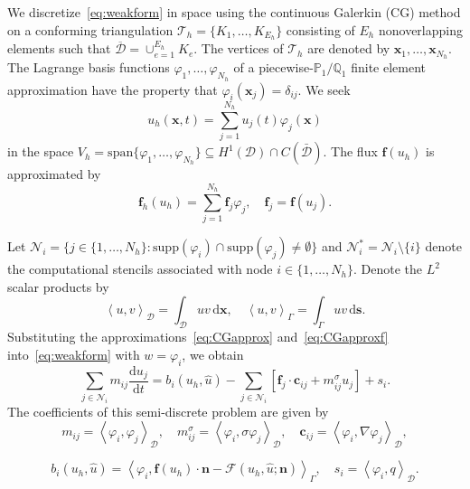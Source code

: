 \documentclass[preprint, 11pt]{elsarticle}
\newcommand{\diff}{\mathrm{d} }
\newcommand{\N}{\mathcal{N}}
\newcommand{\x}{\mathbf{x}}
\newcommand{\s}{\mathbf{s}}
\newcommand{\n}{\mathbf{n}}
\newcommand{\f}{\mathbf{f}}
\newcommand{\con}{\mathbf{c}}
\newcommand{\D}{\mathcal{D}}
\newcommand{\sprod}[2]{\left\langle #1, #2 \right\rangle}
\begin{document}
We discretize~\eqref{eq:weakform} in space using the continuous Galerkin (CG) method on a conforming triangulation $\mathcal{T}_h =\{K_1,\ldots,K_{E_h}\}$ consisting of $E_h$ nonoverlapping elements such that $\overline{\D} = \cup_{e=1}^{E_h} K_e$. The vertices of  $\mathcal{T}_h$ are denoted by $\x_1,\ldots,\x_{N_h}$.
The Lagrange basis functions $\varphi_1,\ldots, \varphi_{N_h}$ of
 a piecewise-$\mathbb{P}_1/\mathbb{Q}_1$ finite element approximation have the property that $\varphi_i(\x_j) = \delta_{ij}$. We seek 
\begin{equation}\label{eq:CGapprox}
    u_h(\x,t) = \sum_{j = 1}^{N_h} u_j(t) \varphi_j(\x)
\end{equation}
in the space $V_h=\mbox{span}\{\varphi_1,\ldots, \varphi_{N_h}\}\subseteq H^1(\mathcal D)\cap C(\bar{\mathcal D})$. The flux $\f(u_h)$ is approximated by
\begin{equation}\label{eq:CGapproxf}
    \f_h(u_h) = \sum_{j = 1}^{N_h}\f_j \varphi_j,\quad \f_j = \f(u_j).
\end{equation}

Let $\N_i =\{j\in \{1,\ldots, N_h\}: \mathrm{supp}(\varphi_i) \cap\mathrm{supp}(\varphi_j)\not= \emptyset\}$ and $\N_i^* = \N_i\setminus\{i\}$ denote the computational stencils associated with node $i\in \{1,\ldots, N_h\}$. Denote the 
 $L^2$ scalar products by
\begin{equation*}
    \sprod{u}{v}_\D= \int_\D u v\,\diff\x, \quad \sprod{u}{v}_\Gamma =  \int_\Gamma u v\,\diff\s.
\end{equation*}
Substituting the approximations~\eqref{eq:CGapprox} and~\eqref{eq:CGapproxf} into~\eqref{eq:weakform} with $w = \varphi_i$, we obtain
\begin{equation}\label{eq:stdCG}
    \sum_{j\in\N_i} m_{ij} \frac{\diff u_j}{\diff t} = b_i(u_h,\hat u) - \sum_{j\in\N_i} \left[\f_j\cdot \con_{ij} + m_{ij}^{\sigma} u_j  \right] + s_i.
\end{equation}
The coefficients of this semi-discrete problem are given by
\begin{equation}\label{eq:consistentmass}
    m_{ij} = \sprod{\varphi_i}{\varphi_j}_\D,\quad m_{ij}^\sigma = \sprod{\varphi_i}{\sigma \varphi_j}_\D,\quad \con_{ij} =\sprod{\varphi_i}{\nabla\varphi_j}_\D, %
\end{equation}

\begin{equation}\label{eq:consistentbdr}
    b_i(u_h, \hat u) = \sprod{\varphi_i}{\f(u_h) \cdot \n - \mathcal{F}(u_h, \hat u;\n)}_\Gamma,\quad s_i = \sprod{\varphi_i}{q}_\D.
\end{equation}
\end{document}
